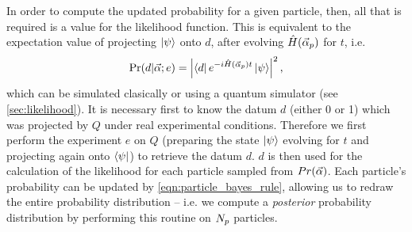 In order to compute the updated probability for a given particle, then, all that is required is a value for the likelihood function.
This is equivalent to the expectation value of projecting $\ket{\psi}$ onto $d$, after evolving $\hat{H}(\vec{\alpha}_p)$ for $t$, i.e. 
\begin{equation}
    \label{eqn:likelihood}
    \Pr(d | \vec{\alpha}; e) = \left| \bra{d} e^{-i \hat{H}(\vec{\alpha}_p)t} \ket{\psi} \right|^2,   
\end{equation}
    which can be simulated clasically or using a quantum simulator (see \cref{sec:likelihood}). 
It is necessary first to know the datum $d$ (either 0 or 1) which was projected by $Q$ under real experimental conditions. 
Therefore we first perform the experiment $e$ on $Q$ 
    (preparing the state $\ket{\psi}$ evolving for $t$ and projecting again onto $\bra{\psi}$)
    to retrieve the datum $d$. 
$d$ is then used for the calculation of the likelihood for each particle sampled from $Pr({\vec{\alpha}})$. 
Each particle's probability can be updated by \cref{eqn:particle_bayes_rule}, 
    allowing us to redraw the entire probability distribution -- i.e. we compute a \emph{posterior} probability distribution
    by performing this routine on $N_p$ particles. 


